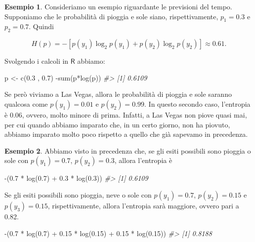 \documentclass[
  11pt,
]{krantz}
\makeatletter
\newenvironment{Shaded}{\begin{snugshade}}{\end{snugshade}}
\newcommand{\CommentTok}[1]{\textcolor[rgb]{0.37,0.37,0.37}{\textit{#1}}}
\newcommand{\FloatTok}[1]{\textcolor[rgb]{0.06,0.06,0.06}{#1}}
\newcommand{\FunctionTok}[1]{\textcolor[rgb]{0,0,0}{#1}}
\newcommand{\NormalTok}[1]{#1}
\newcommand{\OtherTok}[1]{\textcolor[rgb]{0.37,0.37,0.37}{#1}}
\newcommand{\SpecialCharTok}[1]{\textcolor[rgb]{0,0,0}{#1}}
\newenvironment{kframe}{%
\medskip{}
\setlength{\fboxsep}{.8em}
 \def\at@end@of@kframe{}%
 \ifinner\ifhmode%
  \def\at@end@of@kframe{\end{minipage}}%
  \begin{minipage}{\columnwidth}%
 \fi\fi%
 \def\FrameCommand##1{\hskip\@totalleftmargin \hskip-\fboxsep
 \colorbox{shadecolor}{##1}\hskip-\fboxsep
     \hskip-\linewidth \hskip-\@totalleftmargin \hskip\columnwidth}%
 \MakeFramed {\advance\hsize-\width
   \@totalleftmargin\z@ \linewidth\hsize
   \@setminipage}}%
 {\par\unskip\endMakeFramed%
 \at@end@of@kframe}
\renewenvironment{Shaded}{\begin{kframe}}{\end{kframe}}
\newcommand{\R}{\textsf{R}} %
\theoremstyle{definition}
\theoremstyle{definition}
\newtheorem{example}{Esempio}[chapter]
\theoremstyle{definition}
\theoremstyle{definition}
\theoremstyle{remark}
\makeatother
\begin{document}
\begin{example}
Consideriamo un esempio riguardante le previsioni del tempo. Supponiamo che le probabilità di pioggia e sole siano, rispettivamente, \(p_1 = 0.3\) e \(p_2 = 0.7\). Quindi

\[
H(p) = − [p(y_1) \log_2 p(y_1) + p(y_2) \log_2 p(y_2)] \approx 0.61.
\]

Svolgendo i calcoli in \(\R\) abbiamo:

\begin{Shaded}
\begin{Highlighting}[]
\NormalTok{p }\OtherTok{\textless{}{-}} \FunctionTok{c}\NormalTok{(}\FloatTok{0.3}\NormalTok{ , }\FloatTok{0.7}\NormalTok{)}
\SpecialCharTok{{-}}\FunctionTok{sum}\NormalTok{(p}\SpecialCharTok{*}\FunctionTok{log}\NormalTok{(p))}
\CommentTok{\#\textgreater{} [1] 0.6109}
\end{Highlighting}
\end{Shaded}

Se però viviamo a Las Vegas, allora le probabilità di pioggia e sole saranno qualcosa come \(p(y_1) = 0.01\) e \(p(y_2) = 0.99\). In questo secondo caso, l'entropia è 0.06, ovvero, molto minore di prima. Infatti, a Las Vegas non piove quasi mai, per cui quando abbiamo imparato che, in un certo giorno, non ha piovuto, abbiamo imparato molto poco rispetto a quello che già sapevamo in precedenza.
\end{example}

\begin{example}

Abbiamo visto in precedenza che, se gli esiti possibili sono pioggia o sole con \(p(y_1) = 0.7\), \(p(y_2) = 0.3\), allora l'entropia è

\begin{Shaded}
\begin{Highlighting}[]
\SpecialCharTok{{-}}\NormalTok{(}\FloatTok{0.7} \SpecialCharTok{*} \FunctionTok{log}\NormalTok{(}\FloatTok{0.7}\NormalTok{) }\SpecialCharTok{+} \FloatTok{0.3} \SpecialCharTok{*} \FunctionTok{log}\NormalTok{(}\FloatTok{0.3}\NormalTok{))}
\CommentTok{\#\textgreater{} [1] 0.6109}
\end{Highlighting}
\end{Shaded}

Se gli esiti possibili sono pioggia, neve o sole con \(p(y_1) = 0.7\), \(p(y_2) = 0.15\) e \(p(y_3) = 0.15\), rispettivamente, allora l'entropia sarà maggiore, ovvero pari a 0.82.

\begin{Shaded}
\begin{Highlighting}[]
\SpecialCharTok{{-}}\NormalTok{(}\FloatTok{0.7} \SpecialCharTok{*} \FunctionTok{log}\NormalTok{(}\FloatTok{0.7}\NormalTok{) }\SpecialCharTok{+} \FloatTok{0.15} \SpecialCharTok{*} \FunctionTok{log}\NormalTok{(}\FloatTok{0.15}\NormalTok{) }\SpecialCharTok{+} \FloatTok{0.15} \SpecialCharTok{*} \FunctionTok{log}\NormalTok{(}\FloatTok{0.15}\NormalTok{))}
\CommentTok{\#\textgreater{} [1] 0.8188}
\end{Highlighting}
\end{Shaded}

\end{example}
\end{document}
